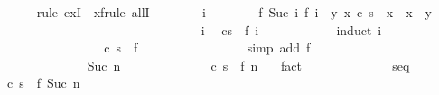 \begin{isabellebody}
\ \ \ \ \isamarkupfalse%
\ {\isacharparenleft}rule\ exI\ {\isacharbrackleft}\ x{\isacharequal}f{\isacharbrackright}{\isacharcomma}rule\ allI{\isacharparenright}\isanewline
\ \ \ \ \ \ \isamarkupfalse%
\ i\isanewline
\ \ \ \ \ \ \isamarkupfalse%
\ {\isachardoublequoteopen}{\isacharparenleft}f\ {\isacharparenleft}Suc\ i{\isacharparenright}{\isacharcomma}\ f\ i{\isacharparenright}\ {\isasymin}\ {\isacharbraceleft}{\isacharparenleft}y{\isacharcomma}\ x{\isacharparenright}{\isachardot}\ {\isasymGamma}{\isasymturnstile}{\isacharparenleft}c{\isacharcomma}\ s{\isacharparenright}\ {\isasymrightarrow}\isactrlsup {\isacharasterisk}\ x\ {\isasymand}\ {\isasymGamma}{\isasymturnstile}x\ {\isasymrightarrow}\ y{\isacharbraceright}\isactrlsup {\isacharplus}{\isachardoublequoteclose}\isanewline
\ \ \ \ \ \ \isamarkupfalse%
\ {\isacharminus}\ \ \ \isanewline
\ \ \ \ \ \ \ \ \isacommand{{\isacharbraceleft}}\isamarkupfalse%
\isanewline
\ \ \ \ \ \ \ \ \ \ \isamarkupfalse%
\ i\ \isamarkupfalse%
\ {\isachardoublequoteopen}{\isasymGamma}{\isasymturnstile}{\isacharparenleft}c{\isacharcomma}s{\isacharparenright}\ {\isasymrightarrow}\isactrlsup {\isacharasterisk}\ f\ i{\isachardoublequoteclose}\isanewline
\ \ \ \ \ \ \ \ \ \ \isamarkupfalse%
\ {\isacharparenleft}induct\ i{\isacharparenright}\isanewline
\ \ \ \ \ \ \ \ \ \ \ \ \isamarkupfalse%
\ {}\ \isamarkupfalse%
\ {\isachardoublequoteopen}{\isasymGamma}{\isasymturnstile}{\isacharparenleft}c{\isacharcomma}\ s{\isacharparenright}\ {\isasymrightarrow}\isactrlsup {\isacharasterisk}\ f\ {}{\isachardoublequoteclose}\isanewline
\ \ \ \ \ \ \ \ \ \ \ \ \ \ \isamarkupfalse%
\ {\isacharparenleft}simp\ add{\isacharcolon}\ f{}{\isacharparenright}\isanewline
\ \ \ \ \ \ \ \ \ \ \isamarkupfalse%
\isanewline
\ \ \ \ \ \ \ \ \ \ \ \ \isamarkupfalse%
\ {\isacharparenleft}Suc\ n{\isacharparenright}\isanewline
\ \ \ \ \ \ \ \ \ \ \ \ \isamarkupfalse%
\ {\isachardoublequoteopen}{\isasymGamma}{\isasymturnstile}{\isacharparenleft}c{\isacharcomma}\ s{\isacharparenright}\ {\isasymrightarrow}\isactrlsup {\isacharasterisk}\ f\ n{\isachardoublequoteclose}\ \ \isamarkupfalse%
\ fact\isanewline
\ \ \ \ \ \ \ \ \ \ \ \ \isamarkupfalse%
\ seq\ \isamarkupfalse%
\ {\isachardoublequoteopen}{\isasymGamma}{\isasymturnstile}{\isacharparenleft}c{\isacharcomma}\ s{\isacharparenright}\ {\isasymrightarrow}\isactrlsup {\isacharasterisk}\ f\ {\isacharparenleft}Suc\ n{\isacharparenright}{\isachardoublequoteclose}\isanewline

\end{isabellebody}
